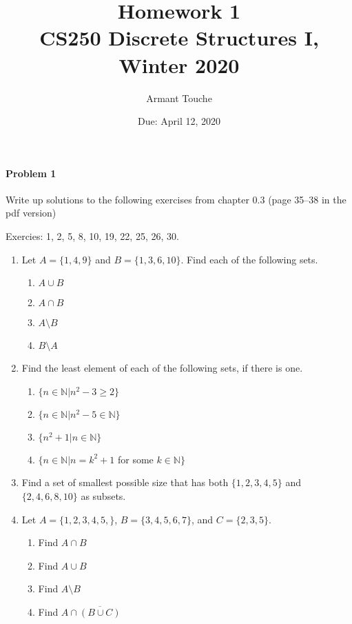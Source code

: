 \documentclass[11pt, a4paper]{article}
\title{\bf Homework 1\\[1ex]
\rm\normalsize CS250 Discrete Structures I, Winter 2020 }
\date{\normalsize Due: April 12, 2020}
\author{\normalsize Armant Touche}
\newcommand\setItemNumber[1]{\setcounter{enumi}{\numexpr#1-1\relax}}
\begin{document}
 

\vspace{0cm}\maketitle 

\paragraph{Problem 1} Write up solutions to the following exercises from chapter 0.3 (page 35–38 in the pdf version)

Exercies: 1, 2, 5, 8, 10, 19, 22, 25, 26, 30.

\begin{enumerate}

    \item Let $A = \{1,4,9\}$ and $B = \{1,3,6,10\}$. Find each of the following sets.
        \begin{enumerate}
            \item $A\cup B$ 
            \item $A\cap B$
            \item $A\setminus B$
            \item $B\setminus A$
        \end{enumerate}

    \item Find the least element of each of the following sets, if there is one.
        \begin{enumerate}
            \item $\{n \in\mathbb{N}| n^2 - 3 \geq 2\}$
            \item $\{n \in\mathbb{N}| n^2 - 5 \in \mathbb{N}\}$
            \item $\{n^2 + 1| n \in\mathbb{N}\}$
            \item $\{n \in\mathbb{N}| n = k^2 +1$ for some $k\in\mathbb{N}\}$
        \end{enumerate}

    \setItemNumber{5}
    \item Find a set of smallest possible size that has both $\{1,2,3,4,5\}$ and $\{2,4,6,8,10\}$ as subsets.

    \setItemNumber{8}
    \item Let $A = \{1,2,3,4,5,\}$, $B = \{3,4,5,6,7\}$, and $C = \{2,3,5\}$.
        \begin{enumerate}
            \item Find $A\cap B$
            \item Find $A\cup B$
            \item Find $A\setminus B$
            \item Find $A\cap\overline{(B\cup C)}$
        \end{enumerate}


\end{enumerate}
\end{document}
